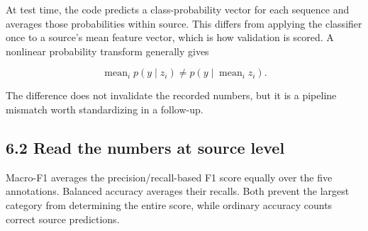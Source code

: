 \documentclass[11pt,letterpaper]{article}
\begin{document}
At test time, the code predicts a class-probability vector for each
sequence and averages those probabilities within source. This differs
from applying the classifier once to a source's mean feature vector,
which is how validation is scored. A nonlinear probability transform
generally gives

\[
\operatorname{mean}_i p(y\mid z_i)
\ne
p(y\mid \operatorname{mean}_i z_i).
\]

The difference does not invalidate the recorded numbers, but it is a
pipeline mismatch worth standardizing in a follow-up.

\subsection{6.2 Read the numbers at source
level}\label{read-the-numbers-at-source-level}

Macro-F1 averages the precision/recall-based F1 score equally over the
five annotations. Balanced accuracy averages their recalls. Both prevent
the largest category from determining the entire score, while ordinary
accuracy counts correct source predictions.
\end{document}
